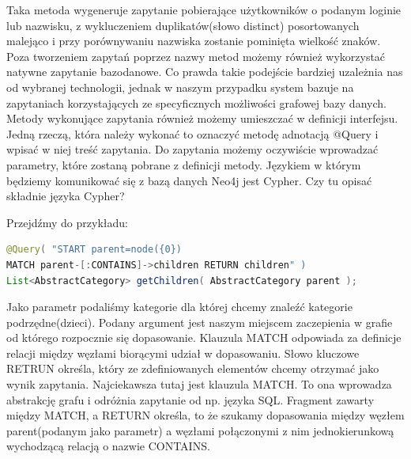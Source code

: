 Taka metoda wygeneruje zapytanie pobierające użytkowników o podanym loginie lub nazwisku, z wykluczeniem duplikatów(słowo distinct) posortowanych malejąco i przy porównywaniu nazwiska zostanie pominięta wielkość znaków. 
Poza tworzeniem zapytań poprzez nazwy metod możemy również wykorzystać natywne zapytanie bazodanowe. Co prawda takie podejście bardziej uzależnia nas od wybranej technologii, jednak w naszym przypadku system bazuje na zapytaniach korzystających ze specyficznych możliwości grafowej bazy danych. Metody wykonujące zapytania również możemy umieszczać w definicji interfejsu. Jedną rzeczą, która należy wykonać to oznaczyć metodę adnotacją @Query i wpisać w niej treść zapytania. Do zapytania możemy oczywiście wprowadzać parametry, które zostaną pobrane z definicji metody. Językiem w którym będziemy komunikować się z bazą danych Neo4j jest Cypher. 
Czy tu opisać składnie języka Cypher?

Przejdźmy do przykładu:

\begin{lstlisting}[language=Java]
@Query( "START parent=node({0}) 
MATCH parent-[:CONTAINS]->children RETURN children" )
List<AbstractCategory> getChildren( AbstractCategory parent );
\end{lstlisting}

Jako parametr podaliśmy kategorie dla której chcemy znaleźć kategorie podrzędne(dzieci). Podany argument jest naszym miejscem zaczepienia w grafie od którego rozpocznie się dopasowanie. Klauzula MATCH odpowiada za definicje relacji między węzłami biorącymi udział w dopasowaniu. Słowo kluczowe RETRUN określa, który ze zdefiniowanych elementów chcemy otrzymać jako wynik zapytania. Najciekawsza tutaj jest klauzula MATCH. To ona wprowadza abstrakcję grafu i odróżnia zapytanie od np. języka SQL. Fragment zawarty między MATCH, a RETURN określa, to że szukamy dopasowania między węzłem parent(podanym jako parametr) a węzłami połączonymi z nim  jednokierunkową wychodzącą relacją o nazwie CONTAINS. 
